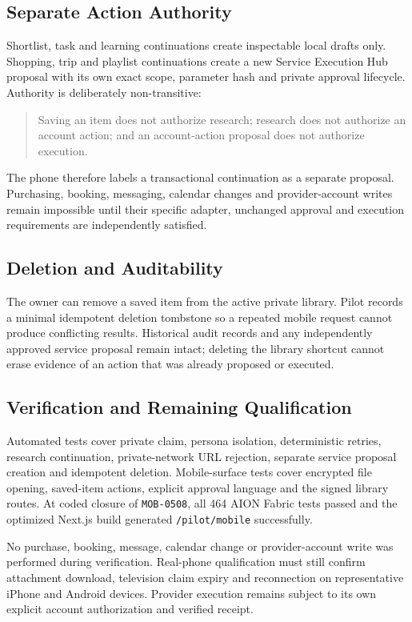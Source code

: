 \subsection{Separate Action Authority}

Shortlist, task and learning continuations create inspectable local drafts only.  Shopping, trip
and playlist continuations create a new Service Execution Hub proposal with its own exact scope,
parameter hash and private approval lifecycle.  Authority is deliberately non-transitive:

\begin{quote}
Saving an item does not authorize research; research does not authorize an account action; and an
account-action proposal does not authorize execution.
\end{quote}

The phone therefore labels a transactional continuation as a separate proposal.  Purchasing,
booking, messaging, calendar changes and provider-account writes remain impossible until their
specific adapter, unchanged approval and execution requirements are independently satisfied.

\subsection{Deletion and Auditability}

The owner can remove a saved item from the active private library.  Pilot records a minimal
idempotent deletion tombstone so a repeated mobile request cannot produce conflicting results.
Historical audit records and any independently approved service proposal remain intact; deleting
the library shortcut cannot erase evidence of an action that was already proposed or executed.

\subsection{Verification and Remaining Qualification}

Automated tests cover private claim, persona isolation, deterministic retries, research
continuation, private-network URL rejection, separate service proposal creation and idempotent
deletion.  Mobile-surface tests cover encrypted file opening, saved-item actions, explicit approval
language and the signed library routes.  At coded closure of \texttt{MOB-0508}, all 464 AION Fabric
tests passed and the optimized Next.js build generated \texttt{/pilot/mobile} successfully.

No purchase, booking, message, calendar change or provider-account write was performed during
verification.  Real-phone qualification must still confirm attachment download, television claim
expiry and reconnection on representative iPhone and Android devices.  Provider execution remains
subject to its own explicit account authorization and verified receipt.
\endgroup
